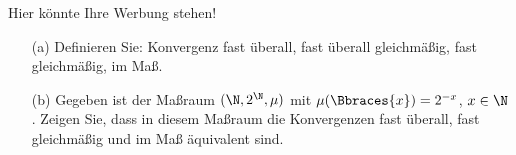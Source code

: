 \begin{exercise}

Hier könnte Ihre Werbung stehen!

\begin{itemize}
  \item[(a)] Definieren Sie: Konvergenz fast überall, fast überall gleichmäßig, fast gleichmäßig, im Maß.
  \item[(b)]  Gegeben ist der Maßraum $(\N, 2^\N, \mu)$ mit $\mu(\Bbraces{x}) = 2^{-x}$, $x \in \N$. Zeigen Sie, dass in diesem Maßraum die Konvergenzen fast überall, fast gleichmäßig und im Maß äquivalent sind.
\end{itemize}

\end{exercise}


